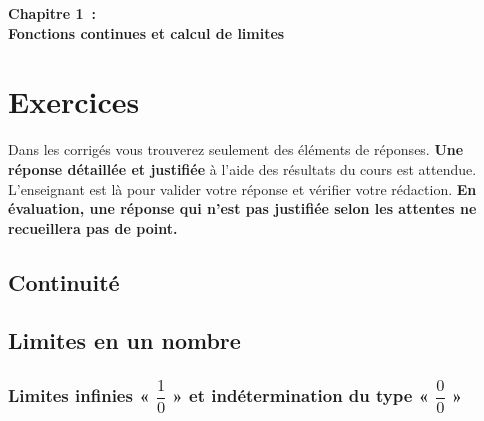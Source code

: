 \documentclass[a4paper,12pt]{article}
\begin{document}
\setlength{\cftbeforesecskip}{2pt}

\setlength{\cftsecindent}{1em}

\begin{center}
	{\bfseries \Huge Chapitre 1~: \\Fonctions continues et calcul de limites}
	

\end{center}
\vspace{-1cm}
\tableofcontents

\newpage

\section{Exercices}
Dans les corrigés vous trouverez seulement des éléments de réponses. {\bfseries Une réponse détaillée et justifiée} à l'aide des résultats du cours est attendue. L'enseignant est là pour valider votre réponse et vérifier votre rédaction. {\bfseries En évaluation, une réponse qui n'est pas justifiée selon les attentes ne recueillera pas de point.} 

\subsection{Continuité}
\subsection{Limites en un nombre}


\subsubsection{Limites infinies « $\dfrac{1}{0}$ » et indétermination du type « $\dfrac{0}{0}$ »}
\end{document}
